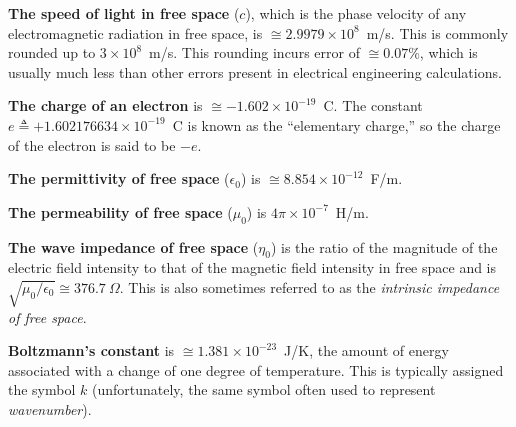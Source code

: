 
\label{m0141_Physical_Constants} %

{\bf The speed of light in free space} 
($c$), which is the phase velocity of any electromagnetic radiation in free space, is $\cong 2.9979 \times 10^8$~m/s.  This is commonly rounded up to $3 \times 10^8$~m/s. This rounding incurs error of $\cong 0.07$\%, which is usually much less than other errors present in electrical engineering calculations.

{\bf The charge of an electron} 
is $\cong -1.602 \times 10^{-19}$~C.
The constant $e\triangleq +1.602176634 \times 10^{-19}$~C is known as the ``elementary charge,'' so the charge of the electron is said to be $-e$. 

{\bf The permittivity of free space} ($\epsilon_0$) is $\cong 8.854 \times 10^{-12}$~F/m.

{\bf The permeability of free space} ($\mu_0$) is $4\pi \times 10^{-7}$~H/m.

{\bf The wave impedance of free space} 
($\eta_0$) is the ratio of the magnitude of the electric field intensity to that of the magnetic field intensity in free space and is $\sqrt{\mu_0/\epsilon_0}\cong 376.7~\Omega$.  This is also sometimes referred to as the \emph{intrinsic impedance of free space}.

{\bf Boltzmann's constant}
is $\cong 1.381 \times 10^{-23}$~J/K, the amount of energy associated with a change of one degree of temperature.
This is typically assigned the symbol $k$ (unfortunately, the same symbol often used to represent \emph{wavenumber}).

